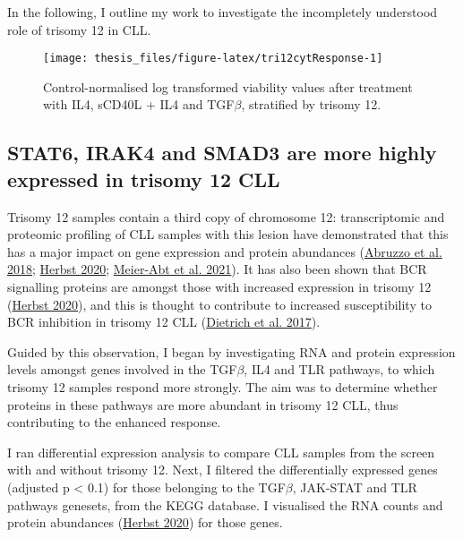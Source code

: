 \documentclass[11pt, a4paper, twosided]{book}
\begin{document}
In the following, I outline my work to investigate the incompletely understood role of trisomy 12 in CLL.


\begin{figure}

{\centering \texttt{[image: thesis\_files/figure-latex/tri12cytResponse-1]} 

}

\caption{Control-normalised log transformed viability values after treatment with IL4, sCD40L + IL4 and TGF\(\beta\), stratified by trisomy 12.}\label{fig:tri12cytResponse}
\end{figure}
\hypertarget{gene-dosage-effects}{%
\subsection{STAT6, IRAK4 and SMAD3 are more highly expressed in trisomy 12 CLL}\label{gene-dosage-effects}}

Trisomy 12 samples contain a third copy of chromosome 12: transcriptomic and proteomic profiling of CLL samples with this lesion have demonstrated that this has a major impact on gene expression and protein abundances (\protect\hyperlink{ref-Abruzzo2018}{Abruzzo et al. 2018}; \protect\hyperlink{ref-HerbstThesis}{Herbst 2020}; \protect\hyperlink{ref-MeierAbt2021}{Meier-Abt et al. 2021}). It has also been shown that BCR signalling proteins are amongst those with increased expression in trisomy 12 (\protect\hyperlink{ref-HerbstThesis}{Herbst 2020}), and this is thought to contribute to increased susceptibility to BCR inhibition in trisomy 12 CLL (\protect\hyperlink{ref-JCIpaper}{Dietrich et al. 2017}).

Guided by this observation, I began by investigating RNA and protein expression levels amongst genes involved in the TGF\(\beta\), IL4 and TLR pathways, to which trisomy 12 samples respond more strongly. The aim was to determine whether proteins in these pathways are more abundant in trisomy 12 CLL, thus contributing to the enhanced response.

I ran differential expression analysis to compare CLL samples from the screen with and without trisomy 12. Next, I filtered the differentially expressed genes (adjusted p \textless{} 0.1) for those belonging to the TGF\(\beta\), JAK-STAT and TLR pathways genesets, from the KEGG database. I visualised the RNA counts and protein abundances (\protect\hyperlink{ref-HerbstThesis}{Herbst 2020}) for those genes.
\end{document}
